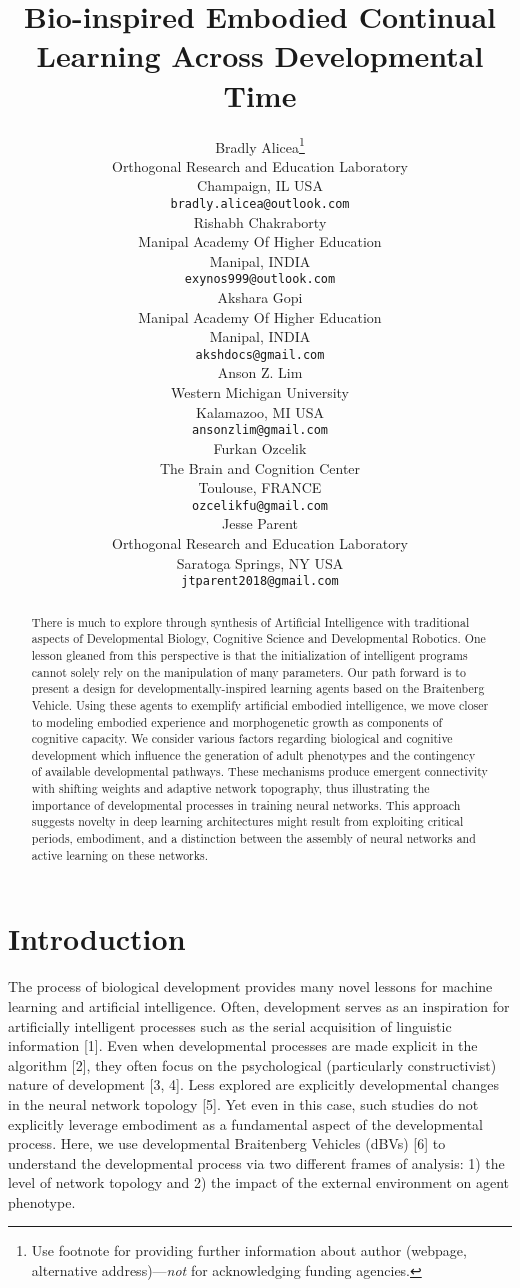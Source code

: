 \documentclass{article}
\title{Bio-inspired Embodied Continual Learning Across Developmental Time}
\author{%
  Bradly Alicea\thanks{Use footnote for providing further information
    about author (webpage, alternative address)---\emph{not} for acknowledging
    funding agencies.} \\
  Orthogonal Research and Education Laboratory\\
  Champaign, IL USA \\
  \texttt{bradly.alicea@outlook.com} \\
\And
  Rishabh Chakraborty \\
  Manipal Academy Of Higher Education \\
  Manipal, INDIA \\
   \texttt{exynos999@outlook.com} \\
\And
  Akshara Gopi \\
  Manipal Academy Of Higher Education \\
  Manipal, INDIA \\
   \texttt{akshdocs@gmail.com} \\
\And
  Anson Z. Lim \\
  Western Michigan University \\
  Kalamazoo, MI USA \\
   \texttt{ansonzlim@gmail.com} \\
\And
  Furkan Ozcelik \\
  The Brain and Cognition Center \\
  Toulouse, FRANCE \\
   \texttt{ozcelikfu@gmail.com} \\
\And
  Jesse Parent \\
  Orthogonal Research and Education Laboratory \\
  Saratoga Springs, NY USA \\
   \texttt{jtparent2018@gmail.com} \\
\AND

}
\begin{document}
\maketitle

\begin{abstract}
There is much to explore through synthesis of Artificial Intelligence with traditional aspects of Developmental Biology, Cognitive Science and Developmental Robotics. One lesson gleaned from this perspective is that the initialization of intelligent programs cannot solely rely on the manipulation of many parameters. Our path forward is to present a design for developmentally-inspired learning agents based on the Braitenberg Vehicle. Using these agents to exemplify artificial embodied intelligence, we move closer to modeling embodied experience and morphogenetic growth as components of cognitive capacity. We consider various factors regarding biological and cognitive development which influence the generation of  adult phenotypes and the contingency of available developmental pathways. These mechanisms produce emergent connectivity with shifting weights and adaptive network topography, thus illustrating the importance of developmental processes in training neural networks. This approach suggests novelty in deep learning architectures might result from exploiting critical periods, embodiment, and a distinction between the assembly of neural networks and active learning on these networks. 
\end{abstract}

\section{Introduction}

The process of biological development provides many novel lessons for machine learning and artificial intelligence. Often, development serves as an inspiration for artificially intelligent processes such as the serial acquisition of linguistic information [1]. Even when developmental processes are made explicit in the algorithm [2], they often focus on the psychological (particularly constructivist) nature of development [3, 4]. Less explored are explicitly developmental changes in the neural network topology [5]. Yet even in this case, such studies do not explicitly leverage embodiment as a fundamental aspect of the developmental process. Here, we use developmental Braitenberg Vehicles (dBVs) [6] to understand the developmental process via two different frames of analysis: 1) the level of network topology and 2) the impact of the external environment on agent phenotype. 
\end{document}
